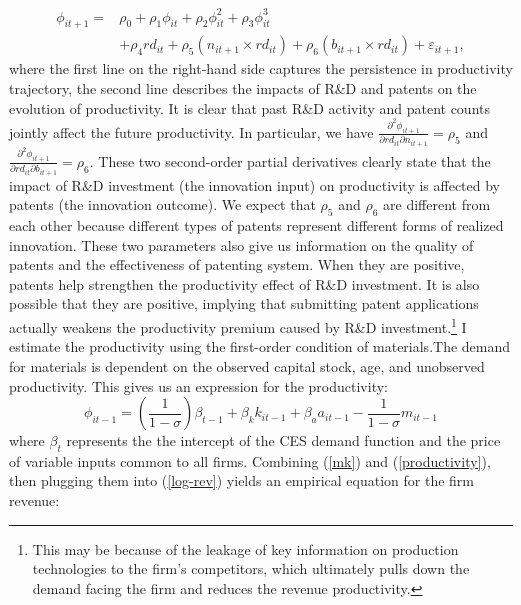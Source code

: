 \documentclass[11pt]{article}
\begin{document}
\begin{align} \label{mk}
\phi_{it+1} =& \rho_{0}+\rho_{1}\phi_{it}+\rho_{2}\phi_{it}^{2}+\rho_{3}\phi_{it}^{3} \\
             & +\rho_{4}rd_{it}+\rho_{5}\left(n_{it+1}\times rd_{it} \right)+\rho_{6}\left(b_{it+1}\times rd_{it}\right)+\varepsilon_{it+1}, \nonumber 
\end{align}
where the first line on the right-hand side captures the persistence
in productivity trajectory, the second line describes the impacts of R\&D and
patents on the evolution of productivity. It is clear that past R\&D activity and patent counts jointly affect the future productivity. In particular, we have $\frac{\partial^2 \phi_{it+1}}{\partial rd_{it}\partial n_{it+1}}=\rho_5$ and $\frac{\partial^2 \phi_{it+1}}{\partial rd_{it}\partial b_{it+1}}=\rho_6$. These two second-order partial derivatives clearly state that the impact of R\&D investment (the innovation input) on productivity is affected by patents (the innovation outcome). We expect
that $\rho_{5}$ and $\rho_{6}$ are different from each other because
different types of patents represent different forms of realized innovation. These two
parameters also give us information on the quality of patents and the effectiveness of patenting system. When they are positive, patents help strengthen the productivity effect of R\&D investment. It is also possible that they are positive, implying that submitting patent applications actually weakens the productivity premium caused by R\&D investment.\footnote{This may be because of the leakage of key information on production technologies to the firm's competitors, which ultimately pulls down the demand facing the firm and reduces the revenue productivity.} 
I estimate the productivity using the first-order condition of materials.The demand for materials is dependent on the observed capital stock, age, and unobserved productivity. This gives us an expression for the productivity:
\begin{equation}
\phi_{it-1}=\left(\frac{1}{1-\sigma}\right)\beta_{t-1}+\beta_{k}k_{it-1}+\beta_{a}a_{it-1}-\frac{1}{1-\sigma}m_{it-1}\label{productivity}
\end{equation}
where $\beta_{t}$ represents the the intercept of the CES demand function and the price of variable inputs common to all firms. Combining (\ref{mk}) and (\ref{productivity}), then plugging them into (\ref{log-rev}) yields an empirical equation for
the firm revenue:
\end{document}
